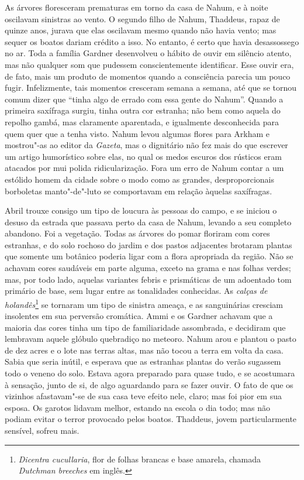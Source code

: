As árvores floresceram prematuras em torno da casa de Nahum, e à noite
oscilavam sinistras ao vento. O segundo filho de Nahum, Thaddeus, rapaz
de quinze anos, jurava que elas oscilavam mesmo quando não havia vento;
mas sequer os boatos dariam crédito a isso. No entanto, é certo que
havia desassossego no ar. Toda a família Gardner desenvolveu o hábito de
ouvir em silêncio atento, mas não qualquer som que pudessem
conscientemente identificar. Esse ouvir era, de fato, mais um produto de
momentos quando a consciência parecia um pouco fugir. Infelizmente, tais
momentos cresceram semana a semana, até que se tornou comum dizer que
``tinha algo de errado com essa gente do Nahum''. Quando a primeira
saxífraga surgiu, tinha outra cor estranha; não bem como aquela do
repolho gambá, mas claramente aparentada, e igualmente desconhecida para
quem quer que a tenha visto. Nahum levou algumas flores para Arkham e
mostrou"-as ao editor da \emph{Gazeta}, mas o dignitário não fez mais do
que escrever um artigo humorístico sobre elas, no qual os medos escuros
dos rústicos eram atacados por mui polida ridicularização. Fora um erro
de Nahum contar a um estólido homem da cidade sobre o modo como as
grandes, desproporcionais borboletas manto"-de"-luto se comportavam em
relação àquelas saxífragas.

Abril trouxe consigo um tipo de loucura às pessoas do campo, e se
iniciou o desuso da estrada que passava perto da casa de Nahum, levando
a seu completo abandono. Foi a vegetação. Todas as árvores do pomar
floriram com cores estranhas, e do solo rochoso do jardim e dos pastos
adjacentes brotaram plantas que somente um botânico poderia ligar com a
flora apropriada da região. Não se achavam cores saudáveis em parte
alguma, exceto na grama e nas folhas verdes; mas, por todo lado, aquelas
variantes febris e prismáticas de um adoentado tom primário de base, sem
lugar entre as tonalidades conhecidas. As \emph{calças de
holandês}\footnote{\emph{Dicentra cucullaria}, flor de folhas brancas e
  base amarela, chamada \emph{Dutchman breeches} em inglês.} se tornaram
um tipo de sinistra ameaça, e as sanguinárias cresciam insolentes em sua
perversão cromática. Ammi e os Gardner achavam que a maioria das cores
tinha um tipo de familiaridade assombrada, e decidiram que lembravam
aquele glóbulo quebradiço no meteoro. Nahum arou e plantou o pasto de
dez acres e o lote nas terras altas, mas não tocou a terra em volta da
casa. Sabia que seria inútil, e esperava que as estranhas plantas do
verão sugassem todo o veneno do solo. Estava agora preparado para quase
tudo, e se acostumara à sensação, junto de si, de algo aguardando para
se fazer ouvir. O fato de que os vizinhos afastavam"-se de sua casa teve
efeito nele, claro; mas foi pior em sua esposa. Os garotos lidavam
melhor, estando na escola o dia todo; mas não podiam evitar o terror
provocado pelos boatos. Thaddeus, jovem particularmente sensível, sofreu
mais.

